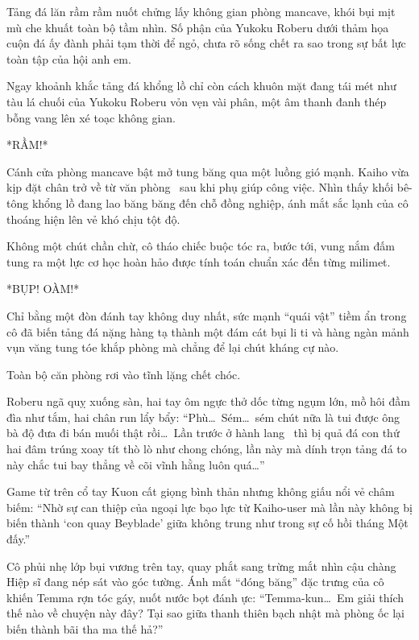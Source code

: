 \documentclass[../main.tex]{subfiles}
\begin{document}
Tảng đá lăn rầm rầm nuốt chửng lấy không gian phòng mancave, khói bụi mịt mù che khuất toàn bộ tầm nhìn. Số phận của Yukoku Roberu dưới thảm họa cuộn đá ấy đành phải tạm thời để ngỏ, chưa rõ sống chết ra sao trong sự bất lực toàn tập của hội anh em.

\omk

Ngay khoảnh khắc tảng đá khổng lồ chỉ còn cách khuôn mặt đang tái mét như tàu lá chuối của Yukoku Roberu vỏn vẹn vài phân, một âm thanh đanh thép bỗng vang lên xé toạc không gian.

*RẦM!*

Cánh cửa phòng mancave bật mở tung băng qua một luồng gió mạnh. Kaiho vừa kịp đặt chân trở về từ văn phòng \hll\ sau khi phụ giúp công việc. Nhìn thấy khối bê-tông khổng lồ đang lao băng băng đến chỗ đồng nghiệp, ánh mắt sắc lạnh của cô thoáng hiện lên vẻ khó chịu tột độ.

Không một chút chần chừ, cô tháo chiếc buộc tóc ra, bước tới, vung nắm đấm tung ra một lực cơ học hoàn hảo được tính toán chuẩn xác đến từng milimet.

*BỤP! OÀM!*

Chỉ bằng một đòn đánh tay không duy nhất, sức mạnh ``quái vật'' tiềm ẩn trong cô đã biến tảng đá nặng hàng tạ thành một đám cát bụi li ti và hàng ngàn mảnh vụn văng tung tóe khắp phòng mà chẳng để lại chút kháng cự nào.

Toàn bộ căn phòng rơi vào tĩnh lặng chết chóc.

Roberu ngã quỵ xuống sàn, hai tay ôm ngực thở dốc từng ngụm lớn, mồ hôi đầm đìa như tắm, hai chân run lẩy bẩy: ``Phù\dots\ Sém\dots\ sém chút nữa là tui được ông bà độ đưa đi bán muối thật rồi\dots\ Lần trước ở hành lang \hll\ thì bị quả đá con thứ hai đâm trúng xoay tít thò lò như chong chóng, lần này mà dính trọn tảng đá to này chắc tui bay thẳng về cõi vĩnh hằng luôn quá\dots''

Game từ trên cổ tay Kuon cất giọng bình thản nhưng không giấu nổi vẻ châm biếm: ``Nhờ sự can thiệp của ngoại lực bạo lực từ Kaiho-user mà lần này không bị biến thành `con quay Beyblade' giữa không trung như trong sự cố hồi tháng Một đấy.''

Cô phủi nhẹ lớp bụi vương trên tay, quay phắt sang trừng mắt nhìn cậu chàng Hiệp sĩ đang nép sát vào góc tường. Ánh mắt ``đóng băng'' đặc trưng của cô khiến Temma rợn tóc gáy, nuốt nước bọt đánh ực: ``Temma-kun\dots\ Em giải thích thế nào về chuyện này đây? Tại sao giữa thanh thiên bạch nhật mà phòng ốc lại biến thành bãi tha ma thế hả?''
\end{document}
